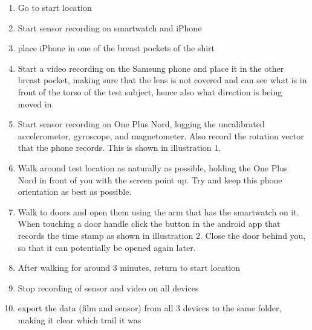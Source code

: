 \begin{enumerate}
	\def\labelenumi{\arabic{enumi}.}
	\tightlist
	\item
	Go to start location
	\item
	Start sensor recording on smartwatch and iPhone
	\item
	place iPhone in one of the breast pockets of the shirt
	\item
	Start a video recording on the Samsung phone and place it in the other
	breast pocket, making sure that the lens is not covered and can see
	what is in front of the torso of the test subject, hence also what
	direction is being moved in.
	\item
	Start sensor recording on One Plus Nord, logging the uncalibrated
	accelerometer, gyroscope, and magnetometer. Also record the rotation
	vector that the phone records. This is shown in illustration 1.
	\item
	Walk around test location as naturally as possible, holding the One
	Plus Nord in front of you with the screen point up. Try and keep this
	phone orientation as best as possible.
	\item
	Walk to doors and open them using the arm that has the smartwatch on
	it. When touching a door handle click the button in the android app
	that records the time stamp as shown in illustration 2. Close the door
	behind you, so that it can potentially be opened again later.
	\item
	After walking for around 3 minutes, return to start location
	\item
	Stop recording of sensor and video on all devices
	\item
	export the data (film and sensor) from all 3 devices to the same
	folder, making it clear which trail it was
\end{enumerate}

